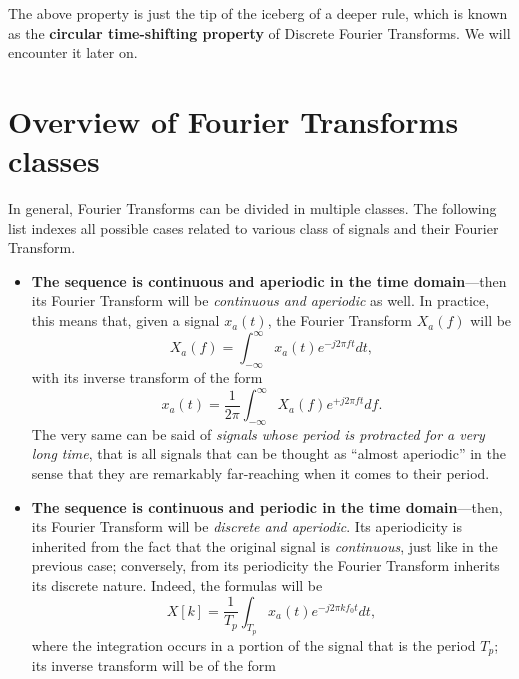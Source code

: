 \documentclass[\documentfontsize, twocolumn]{\classname}
\begin{document}
The above property is just the tip of the iceberg of a deeper rule, which is known as the \textbf{circular time-shifting property} of Discrete Fourier Transforms. We will encounter it later on.

\section{Overview of Fourier Transforms classes}

In general, Fourier Transforms can be divided in multiple classes. The following list indexes all possible cases related to various class of signals and their Fourier Transform.

\begin{itemize}
    \item \textbf{The sequence is continuous and aperiodic in the time domain}---then its Fourier Transform will be \emph{continuous and aperiodic} as well. In practice, this means that, given a signal $x_a(t)$, the Fourier Transform $X_a(f)$ will be
        \begin{equation}\label{eqn:fourierTransformContinuousAperiodic}
            X_a(f) = \int_{-\infty}^\infty x_a(t) e^{-j2\pi ft} dt,
        \end{equation}
        with its inverse transform of the form
        \begin{equation}\label{eqn:inverseFourierTransformContinuousAperiodic}
            x_a(t) = \frac{1}{2\pi} \int_{-\infty}^\infty X_a(f) e^{+j2\pi ft} df.
        \end{equation}
        The very same can be said of \emph{signals whose period is protracted for a very long time}, that is all signals that can be thought as ``almost aperiodic'' in the sense that they are remarkably far-reaching when it comes to their period.
    \item \textbf{The sequence is continuous and periodic in the time domain}---then, its Fourier Transform will be \emph{discrete and aperiodic}. Its aperiodicity is inherited from the fact that the original signal is \emph{continuous}, just like in the previous case; conversely, from its periodicity the Fourier Transform inherits its discrete nature. Indeed, the formulas will be
        \begin{equation}\label{eqn:fourierTransformContinuousPeriodic}
            X[k] = \frac{1}{T_p}\int_{T_p} x_a(t) e^{-j2\pi kf_0t} dt,
        \end{equation}
        where the integration occurs in a portion of the signal that is the period $T_p$; its inverse transform will be of the form

\end{itemize}
\end{document}
